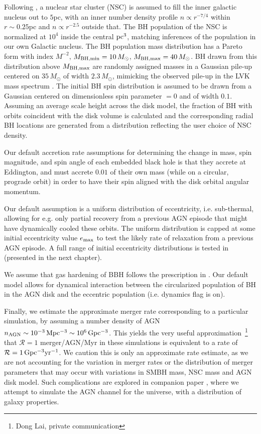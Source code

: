 Following \citet{Generozov+18}, a nuclear star cluster (NSC) is assumed to fill the inner galactic nucleus out to $5$pc, with an inner number density profile $n\propto r^{-7/4}$ within $r\sim 0.25$pc and $n \propto r^{-2.5}$ outside that. The BH population of the NSC is normalized at $10^{4}$ inside the central ${\rm pc}^{3}$, matching inferences of the population in our own Galactic nucleus. The BH population mass distribution has a Pareto form with index $M^{-2}$, $M_{\rm BH, min}=10\,M_{\odot}$, $M_{\rm BH,max}=40\,M_{\odot}$. BH drawn from this distribution above $M_{\rm BH,max}$ are randomly assigned masses in a Gaussian pile-up centered on $35\,M_{\odot}$ of width $2.3\,M_{\odot}$, mimicking the observed pile-up in the LVK mass spectrum \citep{Abbott+23-massbump}. The initial BH spin distribution is assumed to be drawn from a Gaussian centered on dimensionless spin parameter $=0$ and of width $0.1$. Assuming an average scale height across the \citet{SirkoGoodman03} disk model, the fraction of BH with orbits coincident with the disk volume is calculated and the corresponding radial BH locations are generated from a distribution reflecting the user choice of NSC density.


Our default accretion rate assumptions for determining the change in mass, spin magnitude, and spin angle of each embedded black hole is that they accrete at Eddington, and must accrete $0.01$ of their own mass (while on a circular, prograde orbit) in order to have their spin aligned with the disk orbital angular momentum.
 
Our default assumption is a uniform distribution of eccentricity, i.e. sub-thermal, allowing for e.g. only partial recovery from a previous AGN episode that might have dynamically cooled these orbits. The uniform distribution is capped at some initial eccentricity value $e_{\rm max}$ to test the likely rate of relaxation from a previous AGN episode.
A full range of initial eccentricity distributions is tested in \citet{Cook+25} (presented in the next chapter).

 We assume that gas hardening of BBH follows the prescription in \citet{Baruteau11}. Our default model allows for dynamical interaction between the circularized population of BH in the AGN disk and the eccentric population (i.e. dynamics flag is on). 

Finally, we estimate the approximate merger rate corresponding to a particular simulation, by assuming a number density of AGN $n_{\rm AGN} \sim 10^{-3} \,{\rm Mpc^{-3}} \sim 10^{6} \,{\rm Gpc^{-3}}$. This yields the very useful approximation~\footnote{ Dong Lai, private communication} that $\mathcal{R}=1$ merger/AGN/Myr in these simulations is equivalent to a rate of $\mathcal{R}=1\,{\rm Gpc^{-3} yr^{-1}}$. We caution this is only an approximate rate estimate, as we are not accounting for the variation in merger rates or the distribution of merger parameters that may occur with variations in SMBH mass, NSC mass and AGN disk model. Such complications are explored in companion paper \citep{Delfavero+25}, where we attempt to simulate the AGN channel for the universe, with a distribution of galaxy properties.

